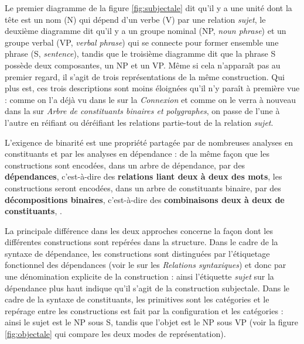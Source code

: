 {    Le premier diagramme de la figure \ref{fig:subjectale} dit qu’il y a une unité dont la tête est un nom (N) qui dépend d’un verbe (V) par une relation \textit{sujet}, le deuxième diagramme \citep{chomsky1957syntactic} dit qu’il y a un groupe nominal (NP, \textit{noun phrase}) et un groupe verbal (VP, \textit{verbal phrase}) qui se connecte pour former ensemble une phrase (S, \textit{sentence}), tandis que le troisième diagramme dit que la phrase S possède deux composantes, un NP et un VP. Même si cela n’apparaît pas au premier regard, il s’agit de trois représentations de la même construction. Qui plus est, ces trois descriptions sont moins éloignées qu’il n’y paraît à première vue : comme on l’a déjà vu dans le  sur la \textit{Connexion} et comme on le verra à nouveau dans la  sur \textit{Arbre de constituants binaires et polygraphes}, on passe de l’une à l’autre en réifiant ou déréifiant les relations partie-tout de la relation \textit{sujet}.

    L’exigence de binarité est une propriété partagée par de nombreuses analyses en constituants et par les analyses en dépendance : de la même façon que les constructions sont encodées, dans un arbre de dépendance, par des \textbf{dépendances}, c’est-à-dire des \textbf{relations liant deux à deux des mots}, les constructions seront encodées, dans un arbre de constituants binaire, par des \textbf{décompositions binaires}, c’est-à-dire des \textbf{combinaisons deux à deux de constituants}, .

    La principale différence dans les deux approches concerne la façon dont les différentes constructions sont repérées dans la structure. Dans le cadre de la syntaxe de dépendance, les constructions sont distinguées par l’étiquetage fonctionnel des dépendances (voir le  sur les \textit{Relations syntaxiques}) et donc par une dénomination explicite de la construction : ainsi l’étiquette \textit{sujet} sur la dépendance plus haut indique qu’il s’agit de la construction subjectale. Dans le cadre de la syntaxe de constituants, les primitives sont les catégories et le repérage entre les constructions est fait par la configuration et les catégories : ainsi le sujet est le NP sous S, tandis que l’objet est le NP sous VP (voir la figure \ref{fig:objectale} qui compare les deux modes de représentation).

}
